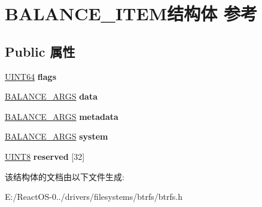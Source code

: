 \hypertarget{struct_b_a_l_a_n_c_e___i_t_e_m}{}\section{B\+A\+L\+A\+N\+C\+E\+\_\+\+I\+T\+E\+M结构体 参考}
\label{struct_b_a_l_a_n_c_e___i_t_e_m}
\subsection*{Public 属性}
\begin{DoxyCompactItemize}
\item 
\mbox{\label{struct_b_a_l_a_n_c_e___i_t_e_m_a8e0bace2b34983584c05851989d56c6b}} 
\hyperlink{_processor_bind_8h_a57be03562867144161c1bfee95ca8f7c}{U\+I\+N\+T64} {\bfseries flags}
\item 
\mbox{\label{struct_b_a_l_a_n_c_e___i_t_e_m_ac25c6df76789fa0b24cd7b6181e51ea1}} 
\hyperlink{struct_b_a_l_a_n_c_e___a_r_g_s}{B\+A\+L\+A\+N\+C\+E\+\_\+\+A\+R\+GS} {\bfseries data}
\item 
\mbox{\label{struct_b_a_l_a_n_c_e___i_t_e_m_a816fe090ccb48f0bf227a4a50ad9e4ab}} 
\hyperlink{struct_b_a_l_a_n_c_e___a_r_g_s}{B\+A\+L\+A\+N\+C\+E\+\_\+\+A\+R\+GS} {\bfseries metadata}
\item 
\mbox{\label{struct_b_a_l_a_n_c_e___i_t_e_m_a9af9335aafa392b61cb1e30f381dcad8}} 
\hyperlink{struct_b_a_l_a_n_c_e___a_r_g_s}{B\+A\+L\+A\+N\+C\+E\+\_\+\+A\+R\+GS} {\bfseries system}
\item 
\mbox{\label{struct_b_a_l_a_n_c_e___i_t_e_m_aaa15ae78cf605413da9fbd3531381eca}} 
\hyperlink{_processor_bind_8h_ab27e9918b538ce9d8ca692479b375b6a}{U\+I\+N\+T8} {\bfseries reserved} \mbox{[}32\mbox{]}
\end{DoxyCompactItemize}


该结构体的文档由以下文件生成\+:\begin{DoxyCompactItemize}
\item 
E\+:/\+React\+O\+S-\/0../drivers/filesystems/btrfs/btrfs.\+h\end{DoxyCompactItemize}
